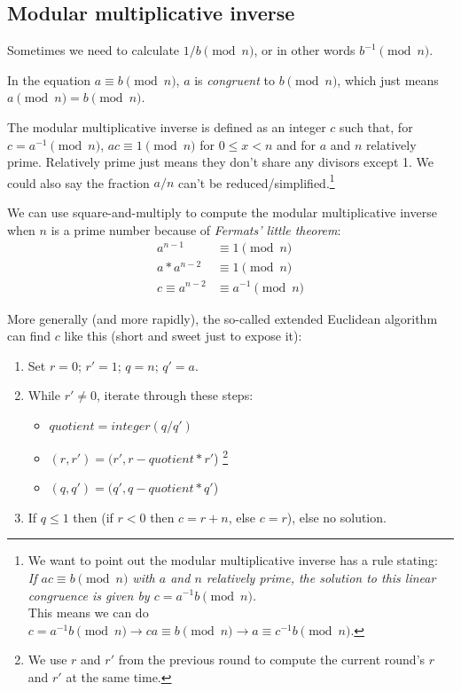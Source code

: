 \subsection{Modular multiplicative inverse}

Sometimes we need to calculate $1/b \pmod n$, or in other words $b^{-1} \pmod n$.

In the equation $a \equiv b \pmod{n}$, $a$ is {\em congruent} to $b \pmod{n}$, which just means \(a \pmod{n} = b \pmod{n}\).

The modular multiplicative inverse is defined as an integer $c$ such that, for $c = a^{-1} \pmod{n}$, $a c \equiv 1 \pmod{n}$ for $0 \leq x < n$ and for $a$ and $n$ relatively prime. Relatively prime just means they don't share any divisors except 1. We could also say the fraction $a/n$ can't be reduced/simplified.\footnote{\label{inverse_rule_note}We want to point out the modular multiplicative inverse has a rule stating:\\
{\em If $a c \equiv b \pmod{n}$ with $a$ and $n$ relatively prime, the solution to this linear congruence is given by \(c = a^{-1} b \pmod{n}\).}\cite{wiki-modular-arithmetic}\\
This means we can do $c = a^{-1} b \pmod n \rightarrow ca \equiv b \pmod n \rightarrow a \equiv c^{-1} b \pmod n$.}

We can use square-and-multiply to compute the modular multiplicative inverse when $n$ is a prime number because of {\em Fermats’ little theorem}: 
\begin{align*} 
a^{n-1} &\equiv 1 \pmod{n} \\
a*a^{n-2} &\equiv 1 \pmod{n} \\
c \equiv a^{n-2} &\equiv a^{-1} \pmod{n}
\end{align*}

More generally (and more rapidly), the so-called extended Euclidean algorithm can find $c$ like this (short and sweet just to expose it):

\begin{enumerate}
    \item Set $r = 0$; $r' =1$; $q = n$; $q' =a$.
    \item While $r' \ne 0$, iterate through these steps:
    \begin{itemize}
        \item $quotient = integer(q/q')$
        \item $(r, r') = (r', r - quotient*r'$) \footnote{We use $r$ and $r'$ from the previous round to compute the current round's $r$ and $r'$ at the same time.}
        \item $(q, q') = (q', q - quotient*q'$)
    \end{itemize}
    \item If $q \leq 1$ then (if $r < 0$ then {\em $c = r + n$}, else {\em $c = r$}), else no solution.
\end{enumerate}


